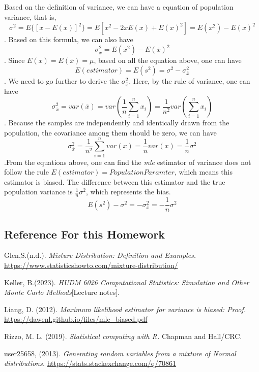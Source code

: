 \documentclass[
]{article}
\begin{document}
Based on the definition of variance, we can have a equation of
population variance, that is,
\[\sigma^2 = E\{[x - E(x)]^2\}=E[x^2-2xE(x)+E(x)^2]=E(x^2)-E(x)^2\].
Based on this formula, we can also have
\[\sigma_{\overline{x}}^2=E(\overline{x}^2)-E(\overline{x})^2\]. Since
\(E(x)=E(\overline{x})=\mu\), based on all the equation above, one can
have \[E(estimator)=E(s^2)= {\sigma}^2 - \sigma_{\overline{x}}^2\]. We
need to go further to derive the \(\sigma_{\overline{x}}^2\). Here, by
the rule of variance, one can have
\[\sigma_{\overline{x}}^2 = var(\overline{x})=var(\frac{1}{n}\sum_{i = 1}^{n}x_i)=\frac{1}{n^2}var(\sum_{i = 1}^{n}x_i)\].
Because the samples are independently and identically drawn from the
population, the covariance among them should be zero, we can have
\[\sigma_{\overline{x}}^2 =\frac{1}{n^2}\sum_{i = 1}^{n}var(x)=\frac{1}{n}var(x)=\frac{1}{n}{\sigma}^2\].From
the equations above, one can find the \emph{mle} estimator of variance
does not follow the rule \(E(estimator) = Population Paramter\), which
means this estimator is biased. The difference between this estimator
and the true population variance is \(\frac{1}{n}{\sigma}^2\), which
represents the bias.
\[E(s^2)-{\sigma}^2 = -\sigma_{\overline{x}}^2=-\frac{1}{n}{\sigma}^2\]

\hypertarget{reference-for-this-homework}{%
\subsection{Reference For this
Homework}\label{reference-for-this-homework}}

Glen,S.(n.d.). \emph{Mixture Distribution: Definition and Examples.}
\url{https://www.statisticshowto.com/mixture-distribution/}

Keller, B.(2023). \emph{HUDM 6026 Computational Statistics: Simulation
and Other Monte Carlo Methods}{[}Lecture notes{]}.

Liang, D. (2012). \emph{Maximum likelihood estimator for variance is
biased: Proof.} \url{https://dawenl.github.io/files/mle_biased.pdf}

Rizzo, M. L. (2019). \emph{Statistical computing with R.} Chapman and
Hall/CRC.

user25658, (2013). \emph{Generating random variables from a mixture of
Normal distributions.} \url{https://stats.stackexchange.com/q/70861}
\end{document}

